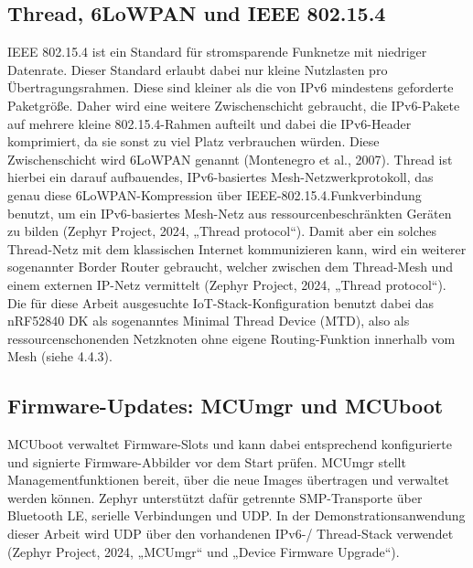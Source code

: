 \subsection{Thread, 6LoWPAN und IEEE 802.15.4}
IEEE 802.15.4 ist ein Standard für stromsparende Funknetze mit niedriger Datenrate. Dieser Standard erlaubt dabei nur kleine Nutzlasten pro Übertragungsrahmen. Diese sind kleiner als die von IPv6 mindestens geforderte Paketgröße. Daher wird eine weitere Zwischenschicht gebraucht, die IPv6-Pakete auf mehrere kleine 802.15.4-Rahmen aufteilt und dabei die IPv6-Header komprimiert, da sie sonst zu viel Platz verbrauchen würden. Diese Zwischenschicht wird 6LoWPAN genannt (Montenegro et al., 2007). Thread ist hierbei ein darauf aufbauendes, IPv6-basiertes Mesh-Netzwerkprotokoll, das genau diese 6LoWPAN-Kompression über IEEE-802.15.4.Funkverbindung benutzt, um ein IPv6-basiertes Mesh-Netz aus ressourcenbeschränkten Geräten zu bilden (Zephyr Project, 2024, „Thread protocol“). Damit aber ein solches Thread-Netz mit dem klassischen Internet kommunizieren kann, wird ein weiterer sogenannter Border Router gebraucht, welcher zwischen dem Thread-Mesh und einem externen IP-Netz vermittelt (Zephyr Project, 2024, „Thread protocol“). Die für diese Arbeit ausgesuchte IoT-Stack-Konfiguration benutzt dabei das nRF52840 DK als sogenanntes Minimal Thread Device (MTD), also als ressourcenschonenden Netzknoten ohne eigene Routing-Funktion innerhalb vom Mesh (siehe 4.4.3).

\subsection{Firmware-Updates: MCUmgr und MCUboot}
MCUboot verwaltet Firmware-Slots und kann dabei entsprechend konfigurierte und signierte Firmware-Abbilder vor dem Start prüfen. MCUmgr stellt Managementfunktionen bereit, über die neue Images übertragen und verwaltet werden können. Zephyr unterstützt dafür getrennte SMP-Transporte über Bluetooth LE, serielle Verbindungen und UDP. In der Demonstrationsanwendung dieser Arbeit wird UDP über den vorhandenen IPv6-/ Thread-Stack verwendet (Zephyr Project, 2024, „MCUmgr“ und „Device Firmware Upgrade“).
